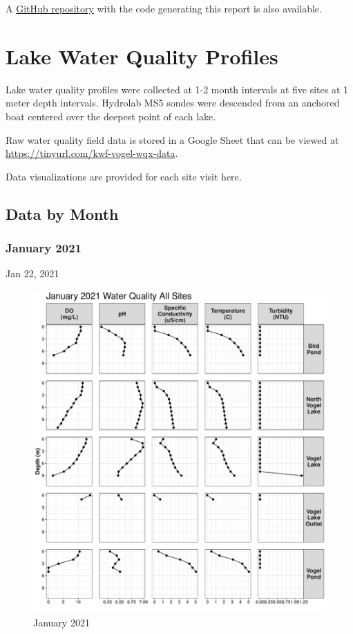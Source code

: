 \documentclass[
]{book}
\begin{document}
A \href{https://github.com/Kenai-Watershed-Forum/Miller_Creek_Vogel_Lake_WQX}{GitHub repository} with the code generating this report is also available.

\hypertarget{lake-water-quality-profiles}{%
\chapter{Lake Water Quality Profiles}\label{lake-water-quality-profiles}}

Lake water quality profiles were collected at 1-2 month intervals at five sites at 1 meter depth intervals. Hydrolab MS5 sondes were descended from an anchored boat centered over the deepest point of each lake.

Raw water quality field data is stored in a Google Sheet that can be viewed at \url{https://tinyurl.com/kwf-vogel-wqx-data}.

Data visualizations are provided for each site visit here.

\hypertarget{data-by-month}{%
\section{Data by Month}\label{data-by-month}}

\hypertarget{january-2021}{%
\subsection{January 2021}\label{january-2021}}

Jan 22, 2021

\begin{figure}
\centering
\includegraphics{Miller_Creek_Vogel_Lake_Water_Quality_files/figure-latex/jan21-wqx-1.pdf}
\caption{\label{fig:jan21-wqx}January 2021}
\end{figure}
\end{document}
